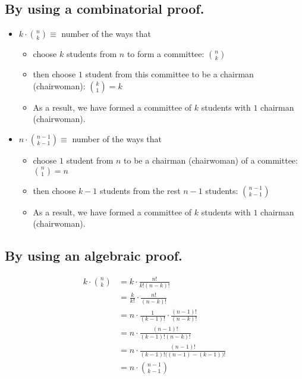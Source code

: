 \documentclass[a4paper]{article}
\begin{document}
\subsection{By using a combinatorial proof.}
\begin{itemize}
    \item $k\cdot \binom{n}{k}\equiv$ number of the ways that 
        \begin{itemize}
            \item choose $k$ students from $n$ to form a committee: $\binom{n}{k}$
            \item then choose $1$ student from this committee to be a chairman (chairwoman): $\binom{k}{1}=k$
            \item As a result, we have formed a committee of $k$ students with $1$ chairman (chairwoman).
        \end{itemize}
    \item $n\cdot \binom{n-1}{k-1}\equiv$ number of the ways that 
        \begin{itemize}
            \item choose $1$ student from $n$ to be a chairman (chairwoman) of a committee: $\binom{n}{1}=n$
            \item then choose $k-1$ students from the rest $n-1$ students: $\binom{n-1}{k-1}$
            \item As a result, we have formed a committee of $k$ students with $1$ chairman (chairwoman).
        \end{itemize}
\end{itemize}

\subsection{By using an algebraic proof.}
\begin{align*}
    k\cdot \binom{n}{k} & = k\cdot \frac{n!}{k!(n-k)!}\\
    & = \frac{k}{k!}\cdot \frac{n!}{(n-k)!}\\
    & = n \cdot \frac{1}{(k-1)!}\cdot \frac{(n-1)!}{(n-k)!}\\
    & = n \cdot \frac{(n-1)!}{(k-1)!(n-k)!}\\
    & = n \cdot \frac{(n-1)!}{(k-1)!\bigl((n-1)-(k-1)\bigr)!}\\
    & = n\cdot \binom{n-1}{k-1}\\
\end{align*}
\end{document}
